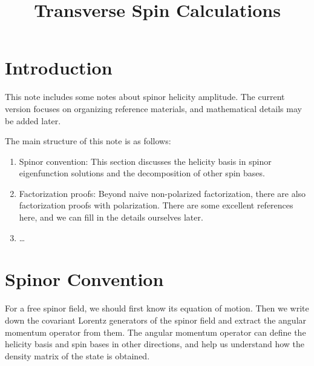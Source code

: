 \documentclass[12pt]{article}
\title{Transverse Spin Calculations}
\author{}
\date{}
\begin{document}
\maketitle

\section*{Introduction}

This note includes some notes about spinor helicity amplitude. The current version focuses on organizing reference materials, and mathematical details may be added later.

The main structure of this note is as follows:

\begin{enumerate}
    \item Spinor convention: This section discusses the helicity basis in spinor eigenfunction solutions and the decomposition of other spin bases.
    \item Factorization proofs: Beyond naive non-polarized factorization, there are also factorization proofs with polarization. There are some excellent references here, and we can fill in the details ourselves later.
    \item \ldots
\end{enumerate}

\section{Spinor Convention}

For a free spinor field, we should first know its equation of motion. Then we write down the covariant Lorentz generators of the spinor field and extract the angular momentum operator from them. The angular momentum operator can define the helicity basis and spin bases in other directions, and help us understand how the density matrix of the state is obtained.
\end{document}

